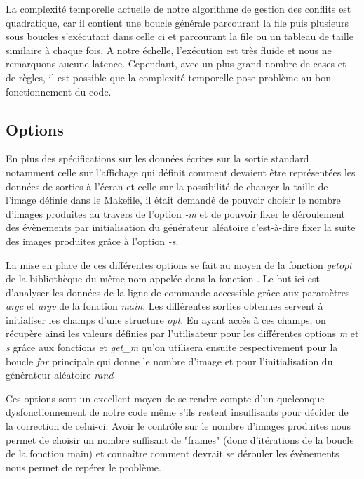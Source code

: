 \documentclass[11pt, a4paper]{article}
\begin{document}
La complexité temporelle actuelle de notre algorithme de gestion des conflits est quadratique, car il contient une boucle générale parcourant la file puis plusieurs sous boucles s'exécutant dans celle ci et parcourant la file ou un tableau de taille similaire à chaque fois. A notre échelle, l'exécution est très fluide et nous ne remarquons aucune latence. Cependant, avec un plus grand nombre de cases et de règles, il est possible que la complexité temporelle pose problème au bon fonctionnement du code.

\subsection{Options}

En plus des spécifications sur les données écrites sur la sortie standard notamment celle sur l'affichage qui définit comment devaient être représentées les données de sorties à l'écran et celle sur la possibilité de changer la taille de l'image définie dans le Makefile, il était demandé  de pouvoir choisir le nombre d'images produites au travers de l'option \textit{-m} et de pouvoir fixer le déroulement des évènements par initialisation du générateur aléatoire c'est-à-dire fixer la suite des images produites grâce à l'option \textit{-s}. 

La mise en place de ces différentes options se fait au moyen de la fonction \textit{getopt} de la bibliothèque du même nom appelée dans la fonction . Le but ici est d'analyser les données de la ligne de commande accessible grâce aux paramètres \textit{argc} et \textit{argv} de la fonction \textit{main}. Les différentes sorties obtenues servent à initialiser les champs d'une structure \textit{opt}.
En ayant accès à ces champs, on récupère ainsi les valeurs définies par l'utilisateur pour les différentes options \textit{\-m} et \textit{\-s} grâce aux fonctions  et \textit{get\_m} qu'on utilisera ensuite respectivement pour la boucle \textit{for} principale qui donne le nombre d'image et pour l'initialisation du générateur aléatoire \textit{rand}

 Ces options sont un excellent moyen de se rendre compte d'un quelconque dysfonctionnement de notre code même s'ils restent insuffisants pour décider de la correction de celui-ci.
Avoir le contrôle sur le nombre d'images produites nous permet de choisir un nombre suffisant de "frames" (donc d'itérations de la boucle de la fonction main) et connaître comment devrait se dérouler les évènements nous permet de repérer le problème.
\end{document}
